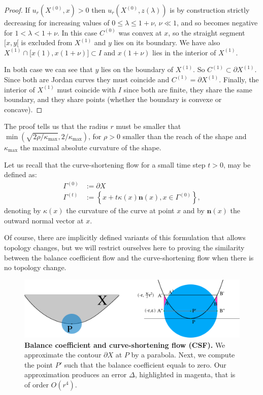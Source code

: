\documentclass[review]{siamart220329}
\begin{document}
\begin{proof}
  If $u_r(X^{(0)},x)>0$ then $u_r(X^{(0)},z(\lambda))$ is by
  construction strictly decreasing for increasing values of $0 \le
  \lambda \le 1+\nu$, $\nu \ll 1$, and so becomes negative for
  $1<\lambda < 1 + \nu$.  In this case $C^{(0)}$ was convex at $x$,
  so the straight segment $\lbrack x,y \lbrack$ is excluded from
  $X^{(1)}$ and $y$ lies on its boundary. We have also $X^{(1)}
  \cap \lbrack x(1),x(1+\nu) \rbrack \subset I$ and $x(1+\nu)$ lies in
  the interior of $X^{(1)}$.

  In both case we can see that $y$ lies on the boundary of
  $X^{(1)}$. So $C^{(1)} \subset \partial X^{(1)}$. Since both
  are Jordan curves they must coincide and $C^{(1)} = \partial
  X^{(1)}$.  Finally, the interior of $X^{(1)}$ must coincide with
  $I$ since both are finite, they share the same boundary, and they
  share points (whether the boundary is convexe or concave).
\end{proof}

The proof tells us that the radius $r$ must be smaller that
$\min(\sqrt{2\rho / \kappa_{\max}},2 / \kappa_{\max})$, for $\rho>0$
smaller than the reach of the shape and $\kappa_{\max}$ the maximal
absolute curvature of the shape.

Let us recall that the curve-shortening flow for a small time step
$t>0$, may be defined as:
\begin{align}
  \Gamma^{(0)} & := \partial X \nonumber \\
  \Gamma^{(t)} & := \left\{ x + t\kappa(x)\mathbf{n}(x), x \in \Gamma^{(0)} \right\}, \label{eq-csf}
\end{align}
denoting by $\kappa(x)$ the curvature of the curve at point $x$
and by $\mathbf{n}(x)$ the outward normal vector at $x$.

Of course, there are implicitly defined variants of this formulation
that allows topology changes, but we will restrict ourselves here to
proving the similarity between the balance coefficient flow and the
curve-shortening flow when there is no topology change.


%
\begin{figure}
\center
\includegraphics[scale=0.75]{figures/analysis-error/geometry-argument.png}
\caption{\textbf{Balance coefficient and curve-shortening flow (CSF).} We approximate the contour $\partial X$ at $P$ by a parabola. Next, we compute the point $P'$ such that the balance coefficient equals to zero. Our approximation produces an error $\Delta$, highlighted in magenta, that is of order $O(r^4)$. \label{fig:geometric-argument}}
\end{figure}
%
\end{document}
